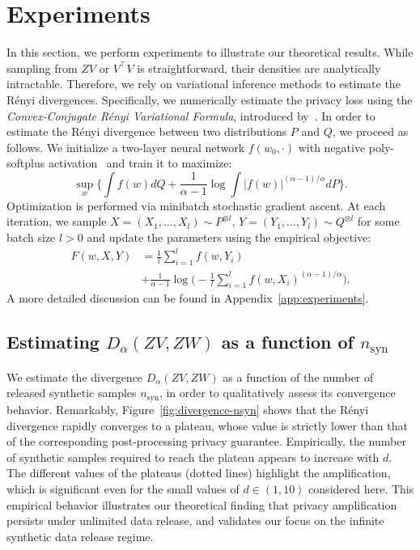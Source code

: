 \documentclass{article}
\theoremstyle{plain}
\theoremstyle{definition}
\theoremstyle{remark}
\begin{document}
\section{Experiments}
\label{sec:experiments}
In this section, we perform experiments to illustrate our theoretical results. While sampling from $ZV$ or $V^\top V$ is straightforward, their densities are analytically intractable. Therefore, we rely on variational inference methods to estimate the Rényi divergences. Specifically, we numerically estimate the privacy loss using the \emph{Convex-Conjugate Rényi Variational Formula}, introduced by~\citet[][(Theorem 2.1 therein]{birrell2023}. In order to estimate the Rényi divergence between two distributions $P$ and $Q$, we proceed as follows. We initialize a two-layer neural network $f(w_0,\cdot)$ with negative poly-softplus activation~\citep{birrell2023} and train it to maximize:
\[\sup_{w} \Big\{ \int f(w)dQ + \frac{1}{\alpha - 1} \log \int |f(w)|^{(\alpha-1)/\alpha} dP \Big\}.\]
Optimization is performed via minibatch stochastic gradient ascent. At each iteration, we sample $X = (X_1,\dots, X_l) \sim P^{\otimes l}$, $Y = (Y_1,\dots,Y_l) \sim Q^{\otimes l}$ for some batch size $l > 0$ and update the parameters using the empirical objective:
\begin{align*}
    F(w,X,Y) &= \textstyle\frac{1}{l}\sum_{i=1}^lf(w,Y_i)\\ & +  \textstyle\frac{1}{\alpha - 1}\log\Big(- \frac{1}{l}\sum_{i=1}^l f(w,X_i)^{(\alpha-1)/\alpha}\Big).
\end{align*}
A more detailed discussion can be found in Appendix~\ref{app:experiments}. 


\subsection{Estimating $D_\alpha(ZV,ZW)$ as a function of $n_{\text{syn}}$}
We estimate the divergence $D_\alpha(ZV,ZW)$ as a function of the number of released synthetic samples $n_{\text{syn}}$, in order to qualitatively assess its convergence behavior. Remarkably, Figure~\ref{fig:divergence-nsyn} shows that the Rényi divergence rapidly converges to a plateau, whose value is strictly lower than that of the corresponding post-processing privacy guarantee. Empirically, the number of synthetic samples required to reach the plateau appears to increase with $d$. The different values of the plateaus (dotted lines) highlight the amplification, which is significant even for the small values of $d \in (1,10)$ considered here. This empirical behavior illustrates our theoretical finding that privacy amplification persists under unlimited data release, and validates our focus on the infinite synthetic data release regime.
\end{document}

